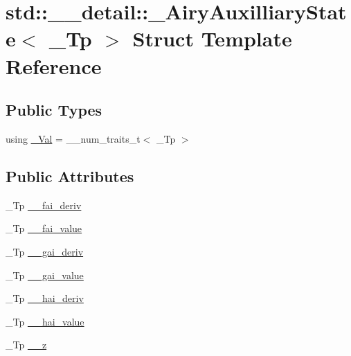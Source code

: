 \hypertarget{structstd_1_1____detail_1_1__AiryAuxilliaryState}{}\section{std\+:\+:\+\_\+\+\_\+detail\+:\+:\+\_\+\+Airy\+Auxilliary\+State$<$ \+\_\+\+Tp $>$ Struct Template Reference}
\label{structstd_1_1____detail_1_1__AiryAuxilliaryState}
\subsection*{Public Types}
\begin{DoxyCompactItemize}
\item 
using \hyperlink{structstd_1_1____detail_1_1__AiryAuxilliaryState_adbacd5bf6d38b157a1e0149cd4b8a9a2}{\+\_\+\+Val} = \+\_\+\+\_\+num\+\_\+traits\+\_\+t$<$ \+\_\+\+Tp $>$
\end{DoxyCompactItemize}
\subsection*{Public Attributes}
\begin{DoxyCompactItemize}
\item 
\+\_\+\+Tp \hyperlink{structstd_1_1____detail_1_1__AiryAuxilliaryState_acff728bf75b30e81549a554ef4c149c1}{\+\_\+\+\_\+fai\+\_\+deriv}
\item 
\+\_\+\+Tp \hyperlink{structstd_1_1____detail_1_1__AiryAuxilliaryState_a71f1d48076c4a91aa4420c0ba3795c42}{\+\_\+\+\_\+fai\+\_\+value}
\item 
\+\_\+\+Tp \hyperlink{structstd_1_1____detail_1_1__AiryAuxilliaryState_a8b653323b9665a4f1768017d3a0e9051}{\+\_\+\+\_\+gai\+\_\+deriv}
\item 
\+\_\+\+Tp \hyperlink{structstd_1_1____detail_1_1__AiryAuxilliaryState_a224d18498e87293887fc8430f87ae12e}{\+\_\+\+\_\+gai\+\_\+value}
\item 
\+\_\+\+Tp \hyperlink{structstd_1_1____detail_1_1__AiryAuxilliaryState_a9aa3de91e8f462bf18033fcc2cfee571}{\+\_\+\+\_\+hai\+\_\+deriv}
\item 
\+\_\+\+Tp \hyperlink{structstd_1_1____detail_1_1__AiryAuxilliaryState_aaa9bc55d2a2d9be324651966cd008a28}{\+\_\+\+\_\+hai\+\_\+value}
\item 
\+\_\+\+Tp \hyperlink{structstd_1_1____detail_1_1__AiryAuxilliaryState_a276bc30e3202259480073e2835075399}{\+\_\+\+\_\+z}
\end{DoxyCompactItemize}


